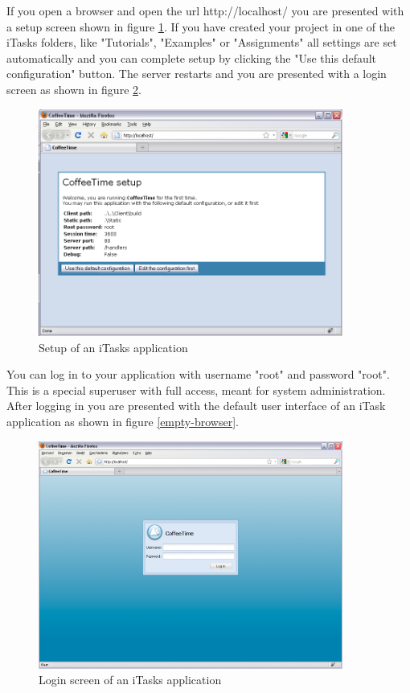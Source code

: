 \documentclass[a4paper,11pt]{article}
\begin{document}
If you open a browser and open the url http://localhost/ you are presented with a setup screen shown in figure \ref{setup-browser}. If you have created your project in one of the iTasks folders, like "Tutorials", "Examples" or "Assignments" all settings are set automatically and you can complete setup by clicking the "Use this default configuration" button. The server restarts and you are presented with a login screen as shown in figure \ref{login-browser}.
\begin{figure}[h]
\centerline{\includegraphics[width=10cm]{GettingStarted-img/setup-browser.png}}
\caption{Setup of an iTasks application} \label{setup-browser}
\end{figure}
You can log in to your application with username "root" and password "root". This is a special superuser with full access, meant for system administration. After logging in you are presented with the default user interface of an iTask application as shown in figure \ref{empty-browser}.
\begin{figure}[h]
\centerline{\includegraphics[width=10cm]{GettingStarted-img/login-browser.png}}
\caption{Login screen of an iTasks application} \label{login-browser}
\end{figure}
\end{document}
